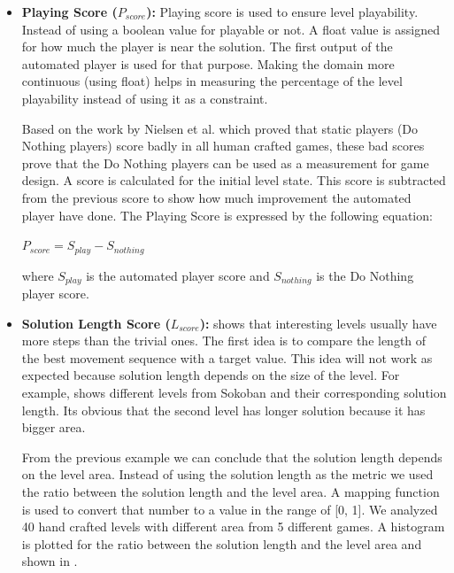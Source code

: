\begin{itemize}
	\item \textbf{Playing Score ($P_{score}$):} Playing score is used to ensure level playability. Instead of using a boolean value for playable or not. A float value is assigned for how much the player is near the solution. The first output of the automated player is used for that purpose. Making the domain more continuous (using float) helps in measuring the percentage of the level playability instead of using it as a constraint.\\\par
	
	Based on the work by Nielsen et al.\cite{gvgpPerformanceProfiles} which proved that static players (Do Nothing players) score badly in all human crafted games, these bad scores prove that the Do Nothing players can be used as a measurement for game design. A score is calculated for the initial level state. This score is subtracted from the previous score to show how much improvement the automated player have done. The Playing Score is expressed by the following equation:
	\begin{center}$ P_{score} = S_{play} - S_{nothing}$\end{center}
	where $S_{play}$ is the automated player score and $S_{nothing}$ is the Do Nothing player score.
	
	\item\textbf{Solution Length Score ($L_{score}$):}  shows that interesting levels usually have more steps than the trivial ones. The first idea is to compare the length of the best movement sequence with a target value. This idea will not work as expected because solution length depends on the size of the level. For example,  shows different levels from Sokoban and their corresponding solution length. Its obvious that the second level has longer solution because it has bigger area.
	
	
	From the previous example we can conclude that the solution length depends on the level area. Instead of using the solution length as the metric we used the ratio between the solution length and the level area. A mapping function is used to convert that number to a value in the range of [0, 1]. We analyzed 40 hand crafted levels with different area from 5 different games. A histogram is plotted for the ratio between the solution length and the level area and shown in .
	

\end{itemize}
